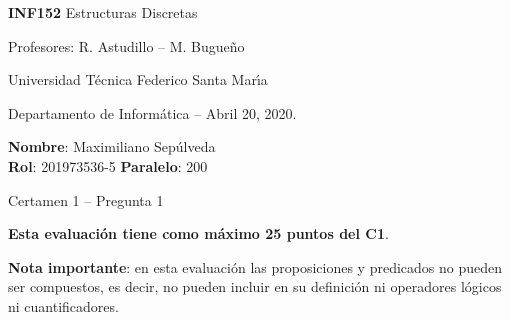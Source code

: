 \documentclass[legalpaper,10pt]{article}
\begin{document}
\thispagestyle{empty}

\begin{minipage}[t]{0.6\textwidth}

{\LARGE \textbf{INF152} Estructuras Discretas}

{\large Profesores: R. Astudillo -- M. Bugueño}

Universidad T\'ecnica Federico Santa Mar\'{\i}a

Departamento de Inform\'atica -- Abril 20, 2020.

\end{minipage}
\hfill
\begin{minipage}[t]{0.35\textwidth}
\textbf{Nombre}: Maximiliano Sepúlveda\\[0.3cm]
\textbf{Rol}: 201973536-5 \textbf{Paralelo}: 200
\end{minipage}

\vspace{0.8cm}

{\Large Certamen 1 -- Pregunta 1}

\vspace{0.4cm}

\textbf{Esta evaluación tiene como máximo 25 puntos del C1}.

\textbf{Nota importante}: en esta evaluación las proposiciones y predicados no pueden ser compuestos, es decir, no pueden incluir en su definición ni operadores lógicos ni cuantificadores.
\end{document}
